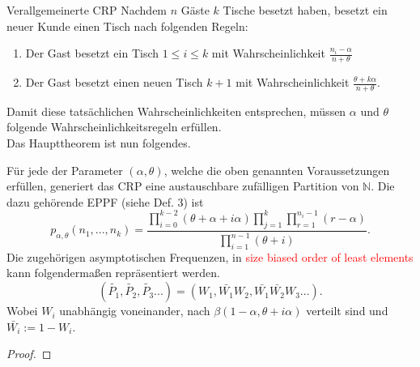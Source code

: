 \begin{section}{Verallgemeinerte CRP}
Nachdem $n$ Gäste $k$ Tische besetzt haben, besetzt ein neuer Kunde einen Tisch nach folgenden Regeln:
\begin{enumerate}
    \item Der Gast besetzt ein Tisch $1 \leq i \leq k$ mit Wahrscheinlichkeit $\frac{n_i-\alpha}{n + \theta}$ 
    \item Der Gast besetzt einen neuen Tisch $k+1$ mit Wahrscheinlichkeit $\frac{\theta + k\alpha}{n + \theta}$.
\end{enumerate}
Damit diese tatsächlichen Wahrscheinlichkeiten entsprechen, müssen $\alpha$ und $\theta$ folgende Wahrscheinlichkeitsregeln erfüllen. \\
Das Haupttheorem ist nun folgendes.
\begin{theorem}
    Für jede der Parameter $(\alpha,\theta)$, welche die oben genannten Voraussetzungen erfüllen, generiert das CRP eine austauschbare zufälligen Partition von $\mathbb{N}$. Die dazu gehörende EPPF (siehe Def. 3) ist 
    \begin{equation}
   p_{\alpha,\theta}(n_1,...,n_k) = \frac{\displaystyle \prod_{i=0}^{k-2}(\theta + \alpha + i\alpha)\prod_{j=1}^{k}\prod_{r=1}^{n_i-1}(r-\alpha)}{\displaystyle\prod_{i=1}^{n-1}(\theta  + i)}.
    \end{equation}
    Die zugehörigen asymptotischen Frequenzen, in \textcolor{red}{size biased order of least elements} kann folgendermaßen repräsentiert werden.
    \[
    (\tilde{P_1},\tilde{P_2},\tilde{P_3}...) = (W_1,\bar{W_1}W_2,\bar{W_1}\bar{W_2}W_3...).
    \]
    Wobei $W_i$ unabhängig voneinander, nach $\beta(1 - \alpha, \theta + i\alpha)$ verteilt sind und $\bar{W_i}:= 1 - W_i$.
\end{theorem}  
\begin{proof}
    
\end{proof}

\end{section}